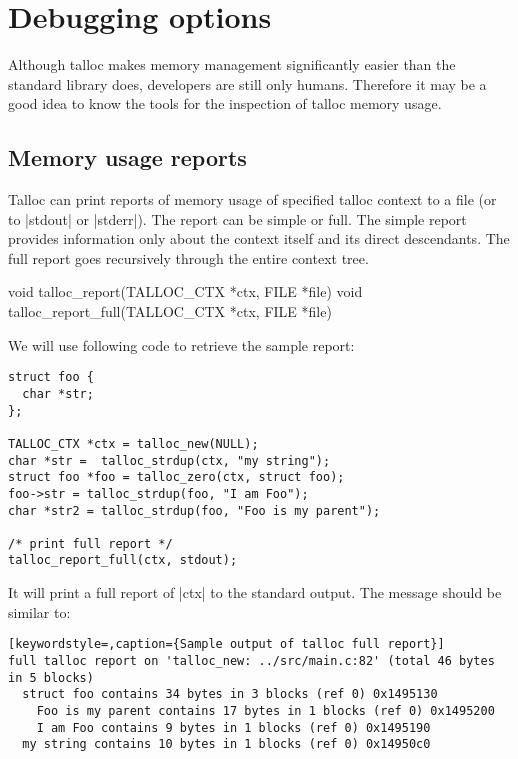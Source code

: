 \section{Debugging options}

Although talloc makes memory management significantly easier than the standard
library does, developers are still only humans. Therefore it may be a good idea
to know the tools for the inspection of talloc memory usage.

\subsection{Memory usage reports}

Talloc can print reports of memory usage of specified talloc context to a file
(or to |stdout| or |stderr|). The report can be simple or full. The simple
report provides information only about the context itself and its direct
descendants. The full report goes recursively through the entire context tree.

\begin{funcproto}
void talloc_report(TALLOC_CTX *ctx, FILE *file)
void talloc_report_full(TALLOC_CTX *ctx, FILE *file)
\end{funcproto}
\funclistend
We will use following code to retrieve the sample report:

\begin{lstlisting}[caption={Full report}]
struct foo {
  char *str;
};

TALLOC_CTX *ctx = talloc_new(NULL);
char *str =  talloc_strdup(ctx, "my string");
struct foo *foo = talloc_zero(ctx, struct foo);
foo->str = talloc_strdup(foo, "I am Foo");
char *str2 = talloc_strdup(foo, "Foo is my parent");

/* print full report */
talloc_report_full(ctx, stdout);
\end{lstlisting}

\noindent
It will print a full report of |ctx| to the standard output. The message should
be similar to:

\begin{lstlisting}[keywordstyle=,caption={Sample output of talloc full report}]
full talloc report on 'talloc_new: ../src/main.c:82' (total 46 bytes in 5 blocks)
  struct foo contains 34 bytes in 3 blocks (ref 0) 0x1495130
    Foo is my parent contains 17 bytes in 1 blocks (ref 0) 0x1495200
    I am Foo contains 9 bytes in 1 blocks (ref 0) 0x1495190
  my string contains 10 bytes in 1 blocks (ref 0) 0x14950c0
\end{lstlisting}

